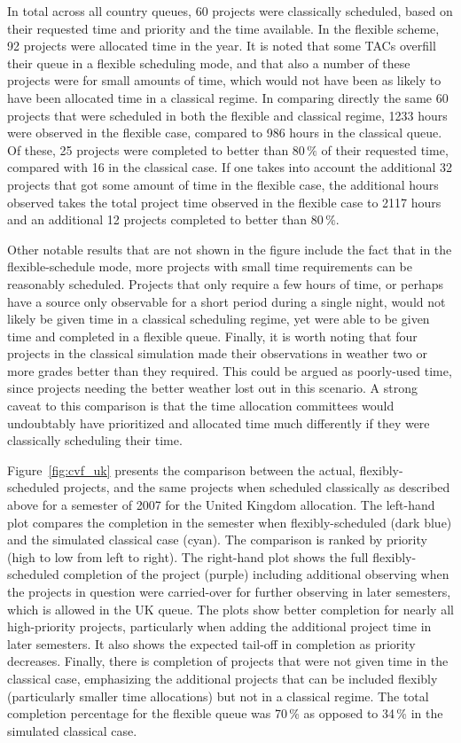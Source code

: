 \documentclass[]{spie}  %
\begin{document}
In total across all country queues, 60 projects were classically
scheduled, based on their requested time and priority and the time
available. In the flexible scheme, 92 projects were allocated time in
the year. It is noted that some TACs overfill their queue in a
flexible scheduling mode, and that also a number of these projects
were for small amounts of time, which would not have been as likely to
have been allocated time in a classical regime. In comparing directly
the same 60 projects that were scheduled in both the flexible and
classical regime, 1233 hours were observed in the flexible case,
compared to 986 hours in the classical queue. Of these, 25 projects
were completed to better than 80\,$\%$ of their requested time, compared
with 16 in the classical case. If one takes into account the
additional 32 projects that got some amount of time in the flexible
case, the additional hours observed takes the total project time
observed in the flexible case to 2117 hours and an additional 12
projects completed to better than 80\,$\%$.

Other notable results that are not shown in the figure include the
fact that in the flexible-schedule mode, more projects with small time
requirements can be reasonably scheduled. Projects that only require a
few hours of time, or perhaps have a source only observable for a
short period during a single night, would not likely be given time in
a classical scheduling regime, yet were able to be given time and
completed in a flexible queue. Finally, it is worth noting that four
projects in the classical simulation made their observations in
weather two or more grades better than they required. This could be
argued as poorly-used time, since projects needing the better weather
lost out in this scenario. A strong caveat to this comparison is that
the time allocation committees would undoubtably have prioritized and
allocated time much differently if they were classically scheduling
their time.

Figure~\ref{fig:cvf_uk} presents the comparison between the actual,
flexibly-scheduled projects, and the same projects when scheduled
classically as described above for a semester of 2007 for the United
Kingdom allocation. The left-hand plot compares the completion in the
semester when flexibly-scheduled (dark blue) and the simulated
classical case (cyan). The comparison is ranked by priority (high to
low from left to right). The right-hand plot shows the full
flexibly-scheduled completion of the project (purple) including
additional observing when the projects in question were carried-over
for further observing in later semesters, which is allowed in the UK
queue. The plots show better completion for nearly all high-priority
projects, particularly when adding the additional project time in
later semesters. It also shows the expected tail-off in completion as
priority decreases. Finally, there is completion of projects that were
not given time in the classical case, emphasizing the additional
projects that can be included flexibly (particularly smaller time
allocations) but not in a classical regime. The total completion
percentage for the flexible queue was 70\,\% as opposed to 34\,\% in
the simulated classical case.
\end{document}
